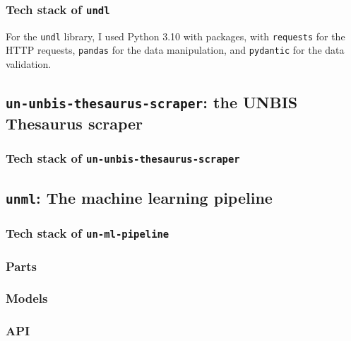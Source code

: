 \documentclass[11pt]{article}
\begin{document}
\subsubsection*{Tech stack of \texttt{undl}} \label{sssec:tech-stack-of-undl}

For the \texttt{undl} library, I used Python 3.10 with packages, with \texttt{requests} for the HTTP requests, \texttt{pandas} for the data manipulation, and \texttt{pydantic} for the data validation.



\subsection{\texttt{un-unbis-thesaurus-scraper}: the UNBIS Thesaurus scraper} \label{ssec:un-unbis-thesaurus-scraper-the-unbis-thesaurus-scraper}

\subsubsection*{Tech stack of \texttt{un-unbis-thesaurus-scraper}} \label{sssec:tech-stack-of-un-unbis-thesaurus-scraper}


\subsection{\texttt{unml}: The machine learning pipeline} \label{ssec:unml-the-machine-learning-pipeline}

\subsubsection*{Tech stack of \texttt{un-ml-pipeline}} \label{sssec:tech-stack-of-un-ml-pipeline}

\subsubsection{Parts} \label{sssec:parts}


\subsubsection{Models} \label{sssec:models}

\subsubsection{API} \label{sssec:api}
\end{document}
